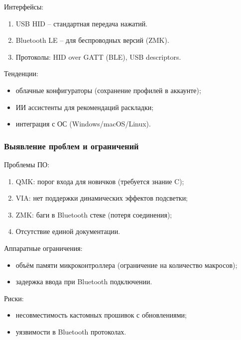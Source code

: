 Интерфейсы:

\begin{enumerate}
\item USB HID -- стандартная передача нажатий.
\item Bluetooth LE -- для беспроводных версий (ZMK).
\item Протоколы: HID over GATT (BLE), USB descriptors.
\end{enumerate}

Тенденции:

\begin{itemize}
\item облачные конфигураторы (сохранение профилей в аккаунте);
\item ИИ ассистенты для рекомендаций раскладки;
\item интеграция с ОС (Windows/macOS/Linux).
\end{itemize}

\subsubsection{Выявление проблем и ограничений}

Проблемы ПО:

\begin{enumerate}
\item QMK: порог входа для новичков (требуется знание C);
\item VIA: нет поддержки динамических эффектов подсветки;
\item ZMK: баги в Bluetooth стеке (потеря соединения);
\item Отсутствие единой документации.
\end{enumerate}

Аппаратные ограничения:

\begin{itemize}
\item объём памяти микроконтроллера (ограничение на количество макросов);
\item задержка ввода при Bluetooth подключении.
\end{itemize}

Риски:

\begin{itemize}
\item несовместимость кастомных прошивок с обновлениями;
\item уязвимости в Bluetooth протоколах.
\end{itemize}